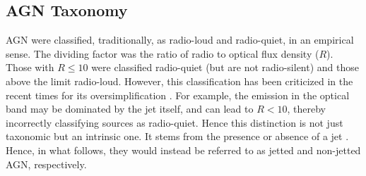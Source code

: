  \subsection{AGN Taxonomy \label{sec:taxonomy}}
AGN were classified, traditionally, as radio-loud and radio-quiet, in an empirical sense. The dividing factor was the ratio of radio to optical flux density ($R$). Those with $R\leq10$ were classified radio-quiet (but are not radio-silent) and those above the limit radio-loud. However, this classification has been criticized in the recent times for its oversimplification \citep[e.g.,][]{Padovani_2016}. For example, the emission in the optical band may be dominated by the jet itself, and can lead to $R<10$, thereby incorrectly classifying sources as radio-quiet. Hence this distinction is not just taxonomic but an intrinsic one. It stems from the presence or absence of a jet \citep{Padovani_2017}. Hence, in what follows, they would instead be referred to as jetted and non-jetted AGN, respectively.

